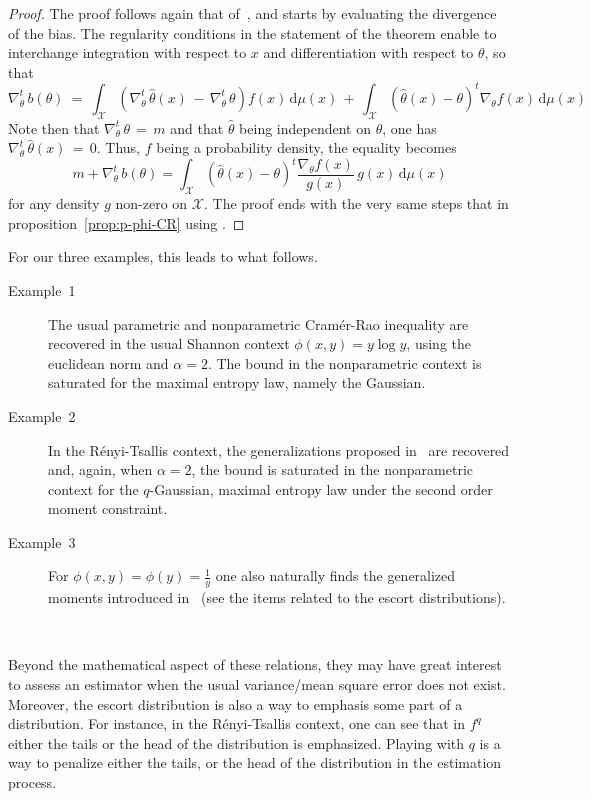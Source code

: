 \documentclass[english,sort&compress]{elsarticle}
\theoremstyle{definition}
\theoremstyle{plain}
\theoremstyle{plain}
\def\dmu{\mathrm{d}\mu}
\def\X{\mathcal{X}}
\begin{document}
\begin{proof}
  The proof  follows again that  of~\cite{Ber13}, and starts  by evaluating
  the divergence of the bias.  The regularity conditions in the statement of the
  theorem   enable  to  interchange   integration  with   respect  to   $x$  and
  differentiation with respect to $\theta$, so that
  \[
  \nabla_\theta^t  \,  b(\theta)  \:  =  \: \int_\X  \left(  \nabla_\theta^t  \,
    \widehat{\theta}(x)  \,  - \,  \nabla_\theta^t  \,  \theta  \right) f(x)  \,
  \dmu(x)  \,  +  \,  \int_\X  \left(  \widehat{\theta}(x)  -  \theta  \right)^t
  \nabla_\theta f(x) \, \dmu(x)
  \]
  Note   then  that   $\nabla_\theta^t  \,   \theta  \,   =  \,   m$   and  that
  $\widehat{\theta}$  being independent  on  $\theta$, one  has $\nabla_\theta^t  \,
  \widehat{\theta}(x) \,  = \, 0$. Thus,  $f$ being a  probability density, the
  equality becomes
  \[
  m + \nabla_\theta^t \, b(\theta) = \int_\X \left( \widehat{\theta}(x) - \theta
  \right)^t \frac{\nabla_\theta f(x)}{g(x)} \, g(x) \, \dmu(x)
  \]
  for any density $g$ non-zero on $\X$.  The proof ends with the very same steps
  that in proposition~\ref{prop:p-phi-CR} using \cite[Lemma~2]{Ber13}.
\end{proof}

%
For our three examples, this leads to what follows. 
%
\begin{description}%
\item[Example~1] The usual parametric  and nonparametric Cram\'er-Rao inequality
  are recovered in the  usual Shannon context $\phi(x,y) = y  \log y$, using the
  euclidean norm  and $\alpha =  2$. The bound  in the nonparametric  context is
  saturated for the maximal entropy law, namely the Gaussian.
%
\item[Example~2]  In the R\'enyi-Tsallis  context, the  generalizations proposed
  in~\cite{Ber12:06_1, Ber12:06_2, Ber13} are recovered and, again, when $\alpha
  =  2$,  the   bound  is  saturated  in  the   nonparametric  context  for  the
  $q$-Gaussian, maximal entropy law under the second order moment constraint.
%
\item[Example~3] For $\phi(x,y) = \phi(y) = \frac{1}{y}$ one also naturally finds
  the generalized moments introduced in~\cite{TsaMen98, MarNic00} (see the items
  related to the escort distributions).
\end{description}

\

Beyond the mathematical aspect of  these relations, they may have great interest
to assess  an estimator when  the usual variance/mean  square error
does not exist. Moreover, the escort distribution is also a way to emphasis some
part of  a distribution. For instance,  in the R\'enyi-Tsallis  context, one can
see  that  in  $f^q$ either  the  tails  or  the  head  of the  distribution  is
emphasized. Playing with $q$  is a way to penalize either the tails, or
the head of the distribution in the estimation process.
\end{document}
